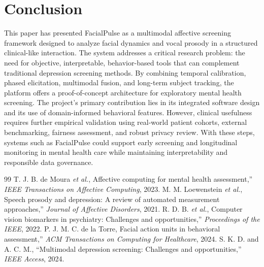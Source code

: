 \documentclass[conference, 12pt]{IEEEtran}
\begin{document}
\section{Conclusion}
This paper has presented FacialPulse as a multimodal affective screening framework designed to analyze facial dynamics and vocal prosody in a structured clinical-like interaction. The system addresses a critical research problem: the need for objective, interpretable, behavior-based tools that can complement traditional depression screening methods. By combining temporal calibration, phased elicitation, multimodal fusion, and long-term subject tracking, the platform offers a proof-of-concept architecture for exploratory mental health screening.
The project’s primary contribution lies in its integrated software design and its use of domain-informed behavioral features. However, clinical usefulness requires further empirical validation using real-world patient cohorts, external benchmarking, fairness assessment, and robust privacy review. With these steps, systems such as FacialPulse could support early screening and longitudinal monitoring in mental health care while maintaining interpretability and responsible data governance.
\balance
\begin{thebibliography}{99}
 T. J. B. de Moura \emph{et al.}, Affective computing for mental health assessment,'' \emph{IEEE Transactions on Affective Computing}, 2023.  M. M. Loewenstein \emph{et al.}, Speech prosody and depression: A review of automated measurement approaches,'' \emph{Journal of Affective Disorders}, 2021.
 R. D. B. \emph{et al.}, Computer vision biomarkers in psychiatry: Challenges and opportunities,'' \emph{Proceedings of the IEEE}, 2022.  P. J. M. C. de la Torre, Facial action units in behavioral assessment,'' \emph{ACM Transactions on Computing for Healthcare}, 2024.
 S. K. D. and A. C. M., ``Multimodal depression screening: Challenges and opportunities,'' \emph{IEEE Access}, 2024.
\end{thebibliography}
\end{document}
